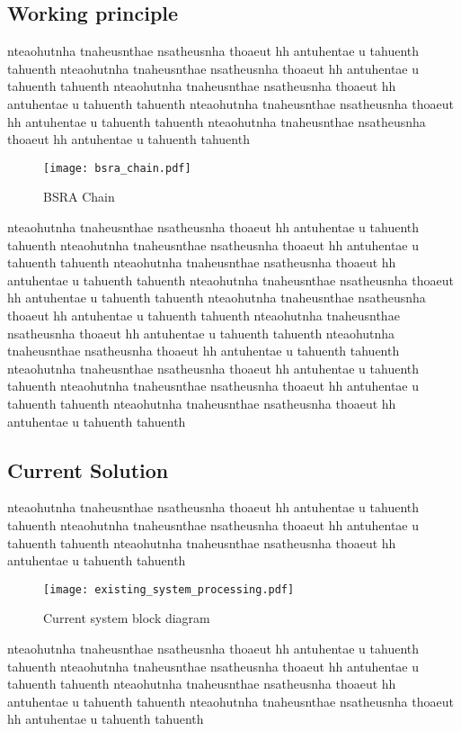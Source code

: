 \subsection{Working principle}
nteaohutnha tnaheusnthae nsatheusnha thoaeut hh antuhentae u tahuenth tahuenth
nteaohutnha tnaheusnthae nsatheusnha thoaeut hh antuhentae u tahuenth tahuenth
nteaohutnha tnaheusnthae nsatheusnha thoaeut hh antuhentae u tahuenth tahuenth
nteaohutnha tnaheusnthae nsatheusnha thoaeut hh antuhentae u tahuenth tahuenth
nteaohutnha tnaheusnthae nsatheusnha thoaeut hh antuhentae u tahuenth tahuenth
\begin{figure}[!tbh]
    \centering
    \texttt{[image: bsra\_chain.pdf]}
    \caption{BSRA Chain}
    \label{fig:bsra_chain}
\end{figure}
nteaohutnha tnaheusnthae nsatheusnha thoaeut hh antuhentae u tahuenth tahuenth
nteaohutnha tnaheusnthae nsatheusnha thoaeut hh antuhentae u tahuenth tahuenth
nteaohutnha tnaheusnthae nsatheusnha thoaeut hh antuhentae u tahuenth tahuenth
nteaohutnha tnaheusnthae nsatheusnha thoaeut hh antuhentae u tahuenth tahuenth
nteaohutnha tnaheusnthae nsatheusnha thoaeut hh antuhentae u tahuenth tahuenth
nteaohutnha tnaheusnthae nsatheusnha thoaeut hh antuhentae u tahuenth tahuenth
nteaohutnha tnaheusnthae nsatheusnha thoaeut hh antuhentae u tahuenth tahuenth
nteaohutnha tnaheusnthae nsatheusnha thoaeut hh antuhentae u tahuenth tahuenth
nteaohutnha tnaheusnthae nsatheusnha thoaeut hh antuhentae u tahuenth tahuenth
nteaohutnha tnaheusnthae nsatheusnha thoaeut hh antuhentae u tahuenth tahuenth

\subsection{Current Solution}
nteaohutnha tnaheusnthae nsatheusnha thoaeut hh antuhentae u tahuenth tahuenth
nteaohutnha tnaheusnthae nsatheusnha thoaeut hh antuhentae u tahuenth tahuenth
nteaohutnha tnaheusnthae nsatheusnha thoaeut hh antuhentae u tahuenth tahuenth
\begin{figure}[!tbh]
    \centering
    \texttt{[image: existing\_system\_processing.pdf]}
    \caption{Current system block diagram}
    \label{fig:current_system_processing}
\end{figure}
nteaohutnha tnaheusnthae nsatheusnha thoaeut hh antuhentae u tahuenth tahuenth
nteaohutnha tnaheusnthae nsatheusnha thoaeut hh antuhentae u tahuenth tahuenth
nteaohutnha tnaheusnthae nsatheusnha thoaeut hh antuhentae u tahuenth tahuenth
nteaohutnha tnaheusnthae nsatheusnha thoaeut hh antuhentae u tahuenth tahuenth

